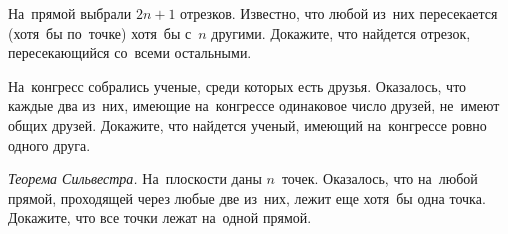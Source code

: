 \begin{problems}
\item
На~прямой выбрали $2 n + 1$ отрезков.
Известно, что любой из~них пересекается (хотя~бы по~точке) хотя~бы
с~$n$ другими.
Докажите, что найдется отрезок, пересекающийся со~всеми остальными.

\item
На~конгресс собрались ученые, среди которых есть друзья.
Оказалось, что каждые два из~них, имеющие на~конгрессе одинаковое число друзей,
не~имеют общих друзей.
Докажите, что найдется ученый, имеющий на~конгрессе ровно одного друга.

\item\emph{Теорема Сильвестра.}
На~плоскости даны $n$~точек.
Оказалось, что на~любой прямой, проходящей через любые две из~них, лежит еще
хотя~бы одна точка.
Докажите, что все точки лежат на~одной прямой.

\end{problems}

